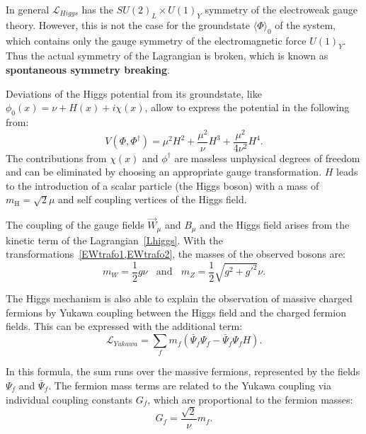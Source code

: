  In general $\mathscr{L}_{Higgs}$ has the $SU(2)_L\times U(1)_Y$ symmetry of the electroweak gauge theory. However, this is not the case for the groundstate $\langle\Phi\rangle _0$ of the system, which contains only the gauge symmetry of the electromagnetic force $U(1)_Y$. Thus the  actual symmetry of the Lagrangian is  broken, which is known as \textbf{spontaneous symmetry breaking}.


Deviations of the Higgs potential from its groundstate,  like $\phi_0(x)=\nu + H(x)+ i\chi(x)$, allow to express the potential in the following from:
\begin{equation}
  V(\Phi,\Phi^{\dagger})=\mu^2H^2+\frac{\mu^2}{\nu}H^3 + \frac{\mu^2}{4\nu^2}H^4.
\end{equation}
The contributions from $\chi(x)$ and $\phi^{\dagger}$ are massless unphysical degrees of freedom and can be eliminated by choosing an appropriate gauge transformation. $H$ leads to the introduction of a scalar particle (the Higgs boson) with a mass of
$m_{\text{H}}=\sqrt{2}\mu$
and self coupling vertices of the Higgs field.

The coupling of the gauge fields $\vec{W}_{\mu}$ and $B_{\mu}$ and the Higgs field arises from the  kinetic term of the Lagrangian~\cref{Lhiggs}. With the transformations~\cref{EWtrafo1,EWtrafo2}, the masses of the observed bosons are:
\begin{equation}
 m_W=\frac{1}{2}g\nu ~~~~ \mathrm{and} ~~~~m_Z=\frac{1}{2}\sqrt{g^2+g'^2}\nu. 
\end{equation}  
 
 
 The Higgs mechanism is also able to explain the observation of massive charged fermions by Yukawa coupling between the Higgs field and the charged fermion fields.
This can be expressed with the additional term:  
\begin{equation}
\mathscr{L}_{Yukawa}=\sum_{f}m_f(\bar{\Psi}_f\Psi_f-\bar{\Psi}_f\Psi_f H).
\end{equation} 

In this formula, the sum runs over the massive fermions, represented by the fields $\Psi_f$ and $\bar{\Psi}_f$. The fermion mass terms are related to the Yukawa coupling via individual coupling constants $G_f$, which are proportional to the fermion masses: 
\begin{equation}\label{Higpro}
G_f = \frac{\sqrt{2}}{\nu} m_f.
\end{equation} 

